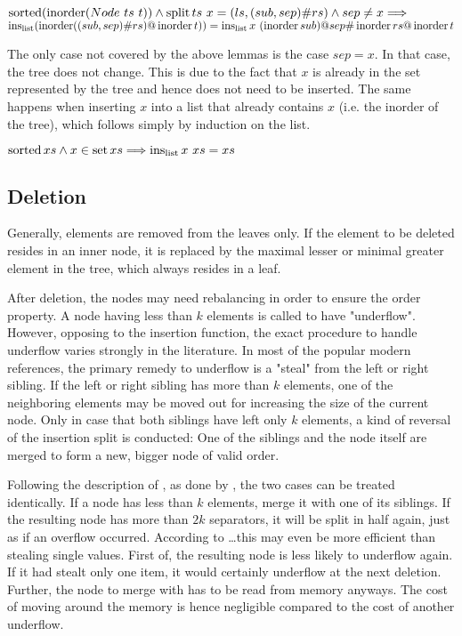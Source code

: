 \begin{lemma}
    $\operatorname{sorted} (\operatorname{inorder} (Node\ ts\ t)) \wedge \operatorname{split} ts\ x = (ls, (sub,sep)\#rs) \wedge sep \neq x \Longrightarrow$ \\
    $\operatorname{ins_{list}} (\operatorname{inorder} ((sub,sep)\#rs) @ \operatorname{inorder} t)) = \operatorname{ins_{list}} x\ (\operatorname{inorder} sub) @ sep \# \operatorname{inorder} rs @ \operatorname{inorder} t$
\end{lemma}

The only case not covered by the above lemmas is the case $sep = x$.
In that case, the tree does not change.
This is due to the fact that $x$ is already in the set represented by the tree
and hence does not need to be inserted.
The same happens when inserting $x$ into a list that already contains $x$
(i.e. the inorder of the tree),
which follows simply by induction on the list.

\begin{lemma}
    $\operatorname{sorted} xs \wedge x \in \operatorname{set} xs \Longrightarrow \operatorname{ins_{list}} x\ xs = xs$
\end{lemma}


\subsection{Deletion}

Generally, elements are removed from the leaves only.
If the element to be deleted resides in an inner node,
it is replaced by the maximal lesser or minimal greater
element in the tree, which always resides in a leaf.

After deletion, the nodes may need rebalancing in order
to ensure the order property.
A node having less than $k$ elements is called to have "underflow".
However, opposing to the insertion function,
the exact procedure to handle underflow varies strongly in the literature.
In most of the popular modern references, %
the primary remedy to underflow is a "steal"
from the left or right sibling.\parencite{DBLP:books/daglib/0023376}
If the left or right sibling has more than $k$ elements,
one of the neighboring elements may be moved out for increasing
the size of the current node.
Only in case that both siblings have left only $k$ elements,
a kind of reversal of the insertion split is conducted:
One of the siblings and the node itself are merged to form
a new, bigger node of valid order.

Following the description of \parencite{DBLP:journals/acta/BayerM72},
as done by \parencite{Fielding80},
the two cases can be treated identically.
If a node has less than $k$ elements,
merge it with one of its siblings.
If the resulting node has more than $2k$ separators,
it will be split in half again, just as if an overflow occurred.
According to \dots this may even be more efficient than stealing single values.
First of, the resulting node is less likely to underflow again.
If it had stealt only one item, it would certainly underflow at the next
deletion.
Further, the node to merge with has to be read from memory anyways.
The cost of moving around the memory
is hence negligible compared to the cost of another underflow.

